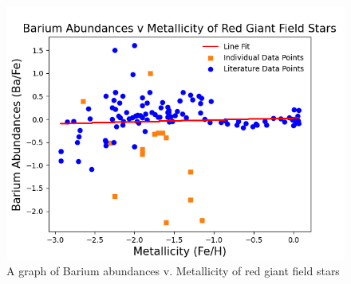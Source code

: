 \begin{figure}[H]
  \includegraphics[width=\textwidth]{Ba_v_Metal.png}
  \caption{A graph of Barium abundances v. Metallicity of red giant field stars}
  \label{Ba_v_Metal}
\end{figure}

